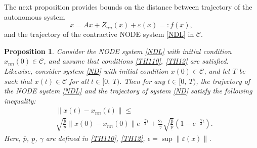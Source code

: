 \documentclass[journal,twoside,web]{ieeecolor}
\newtheorem{proposition}		[theorem]{Proposition}
\begin{document}
The next proposition provides bounds on the distance between trajectory of the autonomous system
\begin{equation}\label{ND}
\dot{x}=Ax+Z_{nn}(x)+\varepsilon(x)=:f(x), 
\end{equation}
and the trajectory of the contractive NODE system \eqref{NDL} in $\mathcal{C}$.
\begin{proposition}\label{proposition2}
Consider the NODE system \eqref{NDL} with initial condition $x_{nn}(0)\in \mathcal{C}$, and assume that conditions \eqref{TH110}, \eqref{TH12} are satisfied. Likewise, consider system \eqref{ND} with initial condition $x(0)\in\mathcal{C}$, and let $T$ be such that $x(t)\in \mathcal{C}$ for all $t\in [0,\ T)$. Then for any $t\in [0,\ T)$, the trajectory of the NODE system \eqref{NDL} and the trajectory of system \eqref{ND} satisfy the following inequality:
 \begin{equation}\label{PR21}
 \begin{aligned}
&\|x(t)-x_{nn}(t)\|\leq \\&\sqrt{\frac{\overline{p}}{\underline{p}}}\|x(0)-x_{nn}(0)\|e^{-\frac{\gamma }{2}t}+\frac{2\epsilon}{\gamma}\sqrt{\frac{\overline{p}}{\underline{p}}}(1-e^{-\frac{\gamma }{2}t}). 
\end{aligned}
\end{equation}
Here, $\overline{p}$, $\underline{p}$, $\gamma$ are defined in \eqref{TH110}, \eqref{TH12}, $\epsilon=\sup \|\varepsilon(x)\|$.
\end{proposition}
\end{document}
